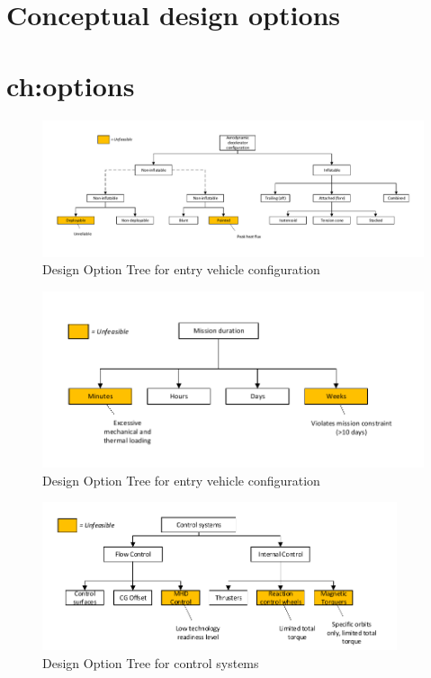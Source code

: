 \section{Conceptual design options} \section{ch:options}

\begin{figure}[H]
\hspace{-23mm}
\includegraphics[width = 1.25\textwidth]{Figure/DOT_configuration.pdf}
\vspace{-5mm}
\caption{Design Option Tree for entry vehicle configuration}
\label{fig:dotconfig}
\end{figure}


\begin{figure}[H]
\centering
\includegraphics[width = 1.0\textwidth]{Figure/DOT_missionduration.pdf}
\vspace{-5mm}
\caption{Design Option Tree for entry vehicle configuration}
\label{fig:dotconfig}
\end{figure}

\begin{figure}[H]
\centering
\includegraphics[width = 0.93\textwidth]{Figure/DOT_control.pdf}
\vspace{-5mm}
\caption{Design Option Tree for control systems}
\label{fig:dotconfig}
\end{figure}
